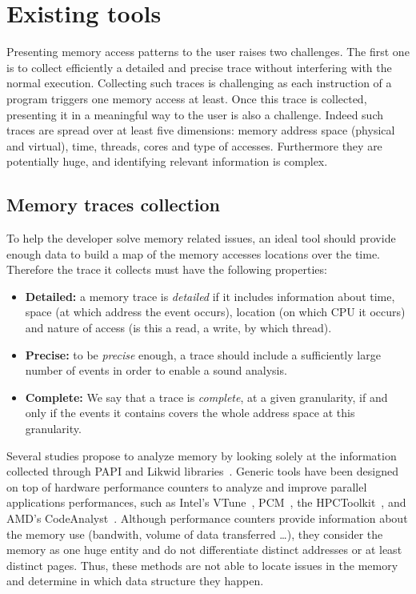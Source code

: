 \section{Existing tools}
\label{sec:mem-tools}

Presenting memory access patterns to the user raises two challenges.
The first one is to collect efficiently a detailed and precise trace without interfering with the normal execution.
Collecting such traces is challenging as each instruction of a program triggers one memory access at least.
Once this trace is collected, presenting it in a meaningful way to the user is also a challenge.
Indeed such traces are spread over at least five dimensions: memory address space (physical and virtual), time, threads, cores and type of accesses.
Furthermore they are potentially huge, and identifying relevant information is complex.

\subsection{Memory traces collection}

To help the developer solve memory related issues, an ideal tool should provide enough data to build a map of the memory accesses locations over the time.
Therefore the trace it collects must have the following properties:
\label{def:traces}
\begin{itemize}
    \item  \textbf{Detailed:}  a memory trace is \emph{detailed} if it includes information about time, space (at which address the event occurs), location (on which CPU it occurs) and nature of access (is this a read, a write, by which thread).
    \item \textbf{Precise:} to be \emph{precise} enough, a trace should include a sufficiently large number of events in order to enable a sound analysis.
    \item \textbf{Complete:} We say that a trace is \emph{complete}, at a given granularity, if and only if the events it contains covers the whole address space at this granularity.
\end{itemize}

Several studies propose to analyze memory  by looking solely at the information collected through \gls{PAPI} and \gls{Likwid} libraries~\cite{Majo13(Mis)understanding, Jiang14Understanding,Bosch00Rivet,Weyers14Visualization,Tao01Visualizing,DeRose01Hardware}.
Generic tools have been designed on top of hardware performance counters to analyze and improve parallel applications performances, such as Intel's \gls{VTune}~\cite{Reinders05VTune}, \gls{PCM}~\cite{Wilhalm12Intel}, the \gls{HPCToolkit}~\cite{Adhianto10HPCTOOLKIT}, and AMD's \gls{CodeAnalyst}~\cite{Drongowski08introduction}.
Although performance counters provide information about the memory use (bandwith, volume of data transferred \ldots),  they consider the memory as one huge entity and do not differentiate distinct addresses or at least distinct pages.
Thus, these methods are not able to locate issues in the memory and determine in which data structure they happen.

